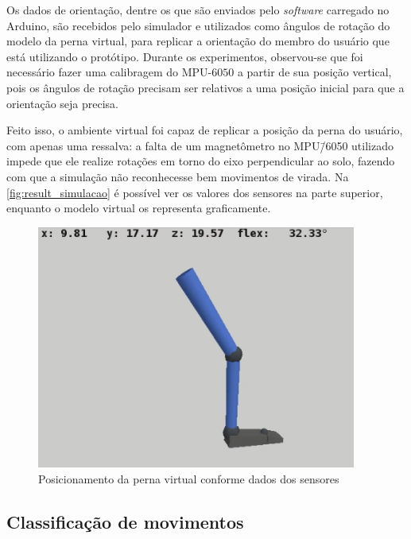 Os dados de orientação, dentre os que são enviados pelo \textit{software} carregado no Arduino, são recebidos pelo simulador e utilizados como ângulos de rotação do modelo da perna virtual, para replicar a orientação do membro do usuário que está utilizando o protótipo. Durante os experimentos, observou-se que foi necessário fazer uma calibragem do MPU-\(6050\) a partir de sua posição vertical, pois os ângulos de rotação precisam ser relativos a uma posição inicial para que a orientação seja precisa.

Feito isso, o ambiente virtual foi capaz de replicar a posição da perna do usuário, com apenas uma ressalva: a falta de um magnetômetro no MPU\=/6050 utilizado impede que ele realize rotações em torno do eixo perpendicular ao solo, fazendo com que a simulação não reconhecesse bem movimentos de virada. Na \autoref{fig:result_simulacao} é possível ver os valores dos sensores na parte superior, enquanto o modelo virtual os representa graficamente.

\begin{figure}[ht]
	\caption{\label{fig:result_simulacao}Posicionamento da perna virtual conforme dados dos sensores}
	\begin{center}
		\includegraphics[height=8cm]{resources/result_simulacao}
	\end{center}
\end{figure}

\subsection{Classificação de movimentos}\label{sec:result_classif}

